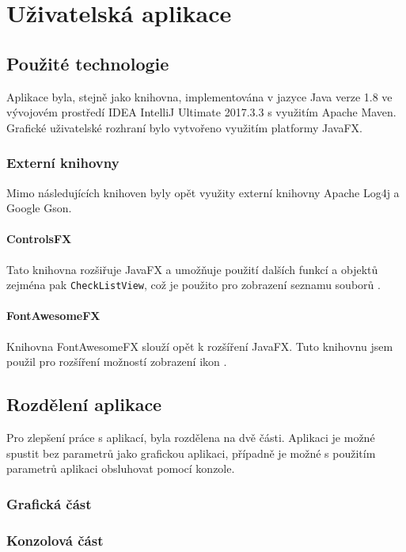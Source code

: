 	\section{Uživatelská aplikace}
	   \subsection{Použité technologie}
	    	 Aplikace byla, stejně jako knihovna, implementována v jazyce Java verze 1.8 ve vývojovém prostředí IDEA IntelliJ Ultimate 2017.3.3 s využitím Apache Maven. Grafické uživatelské rozhraní bylo vytvořeno využitím platformy JavaFX. 
	    	 
	    	 \subsubsection{Externí knihovny}
				Mimo následujících knihoven byly opět využity externí knihovny Apache Log4j a Google Gson.
			
			\paragraph{ControlsFX} 
				Tato knihovna rozšiřuje JavaFX a umožňuje použití dalších funkcí a objektů zejména pak \texttt{CheckListView}, což je použito pro zobrazení seznamu souborů \cite{controlsfx}. 
			
			\paragraph{FontAwesomeFX} 	
				Knihovna FontAwesomeFX slouží opět k rozšíření JavaFX. Tuto knihovnu jsem použil pro rozšíření možností zobrazení ikon \cite{fontawesomefx}.	 
		
		
	    	   
	   \subsection{Rozdělení aplikace}
	   		Pro zlepšení práce s aplikací, byla rozdělena na dvě části. Aplikaci je možné spustit bez parametrů jako grafickou aplikaci, případně je možné s použitím parametrů aplikaci obsluhovat pomocí konzole.
	   		
	   		\subsubsection{Grafická část}
					   		
	   		
	   		\subsubsection{Konzolová část}
	   
